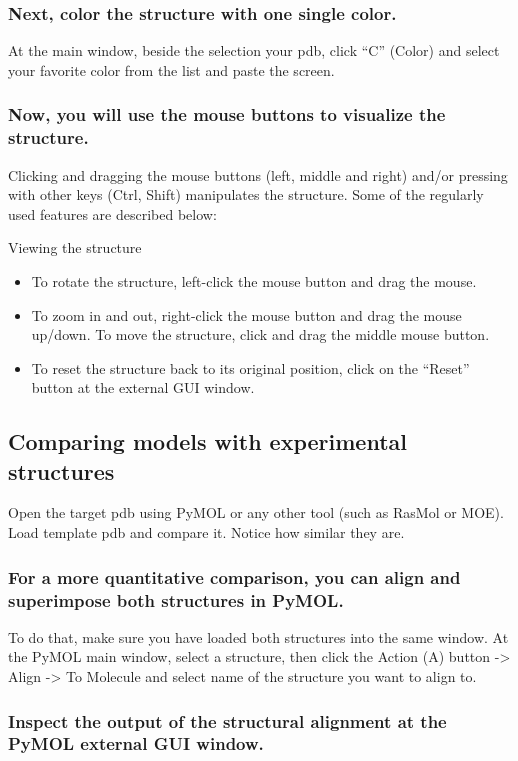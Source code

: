 \documentclass[en,black,12pt,normal]{elegantnote}
\begin{document}
\subsubsection{Next, color the structure with one single color.}
At the main window, beside the selection your pdb, 
click “C” (Color) and select your favorite color from the list and paste the screen.


\subsubsection{Now, you will use the mouse buttons to visualize the structure.}
Clicking and dragging the mouse buttons (left, middle and right) and/or pressing with other keys (Ctrl, Shift) manipulates the structure. 
Some of the regularly used features are described below:

Viewing the structure

\begin{itemize}
    \item To rotate the structure, left-click the mouse button and drag the mouse.
    \item To zoom in and out, right-click the mouse button and drag the mouse up/down. To move the structure, click and drag the middle mouse button.
    \item To reset the structure back to its original position, click on the “Reset” button at the external GUI window.
\end{itemize}



\subsection{Comparing models with experimental structures}
Open the target pdb using PyMOL or any other tool (such as RasMol or MOE). 
Load template pdb and compare it. Notice how similar they are.

\subsubsection{For a more quantitative comparison, you can align and superimpose both structures in PyMOL. }
To do that, make sure you have loaded both structures into the same window. 
At the PyMOL main window, select a structure, then click the Action (A) button -> Align -> To Molecule and select name of the structure you want to align to.



\subsubsection{Inspect the output of the structural alignment at the PyMOL external GUI window.}
\end{document}
